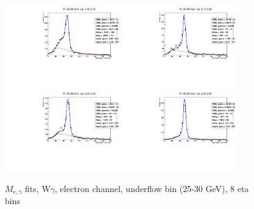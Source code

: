 \begin{figure}[htb]
\begin{center}
   \includegraphics[width=0.45\textwidth]{../figs/figs_v11/ELECTRON_WGamma/EtoGammaFits/sa_hZmass_h_Data_EtoGamma_Enr_ENDCAP_pt25to30_ieta0_noWMtCut.pdf}\includegraphics[width=0.45\textwidth]{../figs/figs_v11/ELECTRON_WGamma/EtoGammaFits/sa_hZmass_h_Data_EtoGamma_Enr_ENDCAP_pt25to30_ieta1_noWMtCut.pdf}\\
   \includegraphics[width=0.45\textwidth]{../figs/figs_v11/ELECTRON_WGamma/EtoGammaFits/sa_hZmass_h_Data_EtoGamma_Enr_ENDCAP_pt25to30_ieta2_noWMtCut.pdf}\includegraphics[width=0.45\textwidth]{../figs/figs_v11/ELECTRON_WGamma/EtoGammaFits/sa_hZmass_h_Data_EtoGamma_Enr_ENDCAP_pt25to30_ieta3_noWMtCut.pdf}\\
  \label{fig:etogFits_25to30}
  \caption{$M_{e,\gamma}$ fits, W$\gamma$, electron channel, underflow bin (25-30 GeV), 8 eta bins}
  \end{center}
\end{figure}

